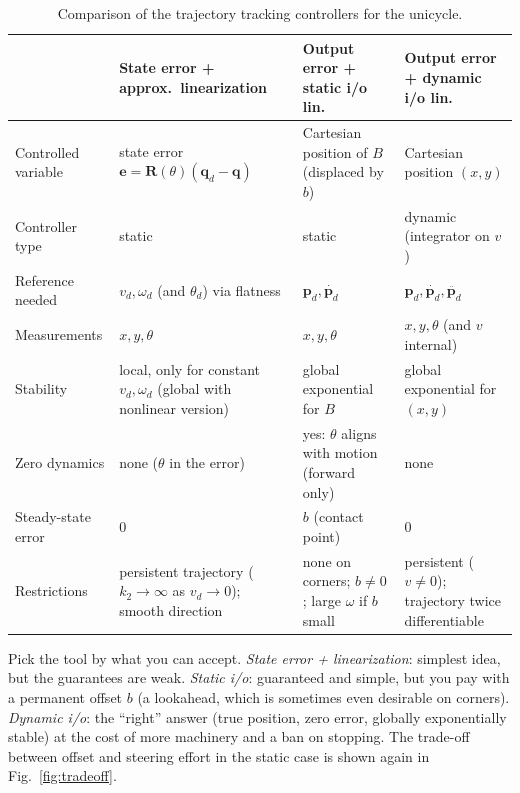 \documentclass[11pt,a4paper]{article}
\newcommand{\vect}[1]{\bm{#1}}
\newcommand{\vd}{v_d}
\newcommand{\omd}{\omega_d}
\newcommand{\pd}{\vect{p}_d}
\newcommand{\qd}{\vect{q}_d}
\theoremstyle{plain}
\theoremstyle{definition}
\theoremstyle{remark}
\begin{document}
\begin{table}[H]
\centering\footnotesize
\setlength{\tabcolsep}{4pt}
\begin{tabularx}{\textwidth}{@{}>{\raggedright\arraybackslash}p{2.35cm}>{\raggedright\arraybackslash}X>{\raggedright\arraybackslash}X>{\raggedright\arraybackslash}X@{}}
\toprule
 & \textbf{State error + approx.\ linearization} & \textbf{Output error + static i/o lin.} & \textbf{Output error + dynamic i/o lin.}\\
\midrule
Controlled variable & state error $\vect e=\vect R(\theta)(\qd-\vect q)$ & Cartesian position of $B$ (displaced by $b$) & Cartesian position $(x,y)$\\
Controller type & static & static & dynamic (integrator on $v$)\\
Reference needed & $\vd,\omd$ (and $\theta_d$) via flatness & $\pd,\dot{\pd}$ & $\pd,\dot{\pd},\ddot{\pd}$\\
Measurements & $x,y,\theta$ & $x,y,\theta$ & $x,y,\theta$ (and $v$ internal)\\
Stability & local, only for constant $\vd,\omd$ (global with nonlinear version) & global exponential for $B$ & global exponential for $(x,y)$\\
Zero dynamics & none ($\theta$ in the error) & yes: $\theta$ aligns with motion (forward only) & none\\
Steady-state error & $0$ & $b$ (contact point) & $0$\\
Restrictions & persistent trajectory ($k_2\to\infty$ as $\vd\to0$); smooth direction & none on corners; $b\neq0$; large $\omega$ if $b$ small & persistent ($v\neq0$); trajectory twice differentiable\\
\bottomrule
\end{tabularx}
\caption{Comparison of the trajectory tracking controllers for the unicycle.}
\end{table}

\begin{intuition}
Pick the tool by what you can accept. \emph{State error + linearization}: simplest idea, but the guarantees are weak. \emph{Static i/o}: guaranteed and simple, but you pay with a permanent offset $b$ (a lookahead, which is sometimes even desirable on corners). \emph{Dynamic i/o}: the ``right'' answer (true position, zero error, globally exponentially stable) at the cost of more machinery and a ban on stopping. The trade-off between offset and steering effort in the static case is shown again in Fig.~\ref{fig:tradeoff}.
\end{intuition}
\end{document}
